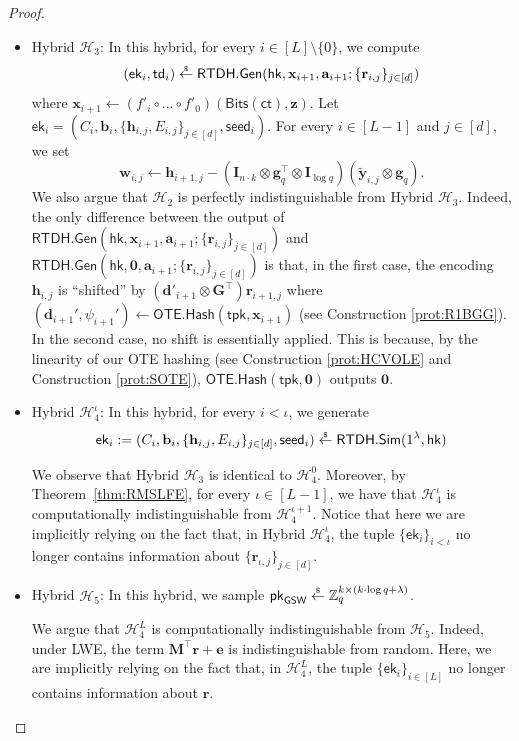 \documentclass{article}
\newcommand{\ek}{\mathsf{ek}}
\newcommand{\td}{\mathsf{td}}
\newcommand{\getsr}{\overset{\raisebox{-1pt}{$\scriptscriptstyle \$$}}{\gets}}
\newcommand{\sample}{\getsr}
\newcommand{\OTE}{\mathsf{OTE}}
\newcommand{\Z}{\mathbb{Z}}
\renewcommand{\sec}{\ensuremath{\lambda}}
\newcommand{\ct}{\mathsf{ct}}
\newcommand{\Sim}{\mathsf{Sim}}
\newcommand{\RTDH}{\mathsf{RTDH}}
\newcommand{\BV}{\mathsf{GSW}}
\newcommand{\algofont}[1]{\ensuremath{\mathsf{#1}}}
\newcommand{\tpk}{{\algofont{tpk}}}
\newcommand{\Gen}{{\algofont{Gen}}}
\newcommand{\Hash}{{\algofont{Hash}}}
\newcommand{\id}{\ensuremath{\mathbf{I}}}
\newcommand{\pk}{{\mathsf{pk}}}
\newcommand{\hk}{\ensuremath{\mathsf{hk}}}
\newcommand{\thmref}[1]{Theorem~\ref{thm:#1}}
\newcommand\bbbone{1}
\begin{document}
\begin{proof}
\begin{itemize}
\item Hybrid ${\mathcal{H}_3}$: In this hybrid, for every $i\in[L]\setminus\{0\}$, we compute
\[(\ek_i, \td_i)\sample\RTDH.\Gen(\hk, \mathbf{x}_{i+1}, \mathbf{a}_{i+1}; \{\mathbf{r}_{i, j}\}_{j\in[d]})\]
where $\mathbf{x}_{i+1}\gets (f'_i\circ \dots\circ f'_0)(\mathsf{Bits}(\ct), \mathbf{z})$. Let $\ek_i=(C_i, \mathbf{b}_i, \{\mathbf{h}_{i, j}, E_{i, j}\}_{j\in[d]}, \mathsf{seed}_i)$. For every $i\in[L-1]$ and $j\in[d]$, we set
\[ \mathbf{w}_{i,j}\gets \mathbf{h}_{i+1,j} -(\id_{n\cdot k}\otimes \mathbf g_q^\intercal\otimes \id_{\log q})(\tilde{\mathbf{y}}_{i,j}\otimes \mathbf g_q). \]
We also argue that ${\mathcal{H}_2}$ is perfectly indistinguishable from Hybrid ${\mathcal{H}_3}$. Indeed, the only difference between the output of $\RTDH.\Gen(\hk, \allowbreak\mathbf{x}_{i+1}, \allowbreak\mathbf{a}_{i+1}; \allowbreak\{\mathbf{r}_{i, j}\}_{j\in[d]})$ and $\RTDH.\Gen(\hk, \allowbreak\mathbf{0}, \allowbreak\mathbf{a}_{i+1}; \allowbreak\{\mathbf{r}_{i, j}\}_{j\in[d]})$
is that, in the first case, the encoding $\mathbf{h}_{i, j}$ is ``shifted'' by $(\mathbf d'_{i+1}\otimes \mathbf G^\intercal)\mathbf r_{i+1,j}$ where $(\mathbf{d}_{i+1}', \psi_{i+1}')\gets \OTE.\Hash(\tpk, \mathbf{x}_{i+1})$ (see Construction \ref{prot:R1BGG}). In the second case, no shift is essentially applied. This is because, by the linearity of our OTE hashing (see Construction \ref{prot:HCVOLE} and Construction \ref{prot:SOTE}), $\OTE.\Hash(\tpk, \mathbf{0})$ outputs $\mathbf{0}$.

\item Hybrid ${\mathcal{H}_4^\iota}$: In this hybrid, for every $i<\iota$, we generate
\[\ek_i:=(C_i, \mathbf{b}_i, \{\mathbf{h}_{i, j}, E_{i, j}\}_{j\in[d]}, \mathsf{seed}_i)\sample\RTDH.\Sim(\bbbone^\sec, \hk)\]


We observe that Hybrid ${\mathcal{H}_3}$ is identical to ${\mathcal{H}_4^0}$. Moreover, by \thmref{RMSLFE}, for every $\iota\in[L-1]$, we have that ${\mathcal{H}_4^\iota}$ is computationally indistinguishable from ${\mathcal{H}_4^{\iota+1}}$. Notice that here we are implicitly relying on the fact that, in Hybrid ${\mathcal{H}_4^\iota}$, the tuple
$\{\ek_i\}_{i<\iota}$ no longer contains information about $\{\mathbf{r}_{\iota, j}\}_{j\in[d]}$.

\item Hybrid ${\mathcal{H}_5}$: In this hybrid, we sample $\pk_\BV\sample\Z_q^{k\times (k\cdot \log q+\sec)}$.


We argue that ${\mathcal{H}_4^L}$ is computationally indistinguishable from ${\mathcal{H}_5}$. Indeed, under LWE, the term $\mathbf{M}^\intercal\mathbf r+\mathbf e$ is indistinguishable from random. Here, we are implicitly relying on the fact that, in ${\mathcal{H}_4^L}$, the tuple $\{\ek_i\}_{i\in[L]}$ no longer contains information about $\mathbf{r}$.


\end{itemize}
\end{proof}
\end{document}

